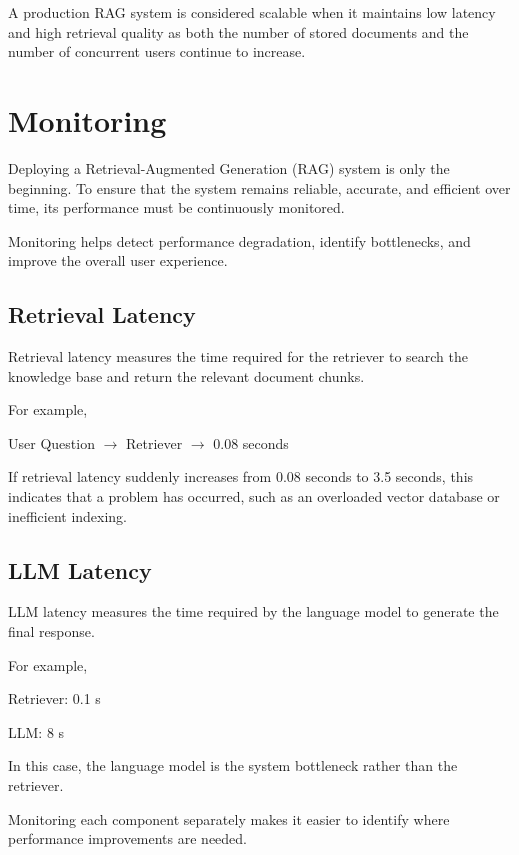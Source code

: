 A production RAG system is considered scalable when it maintains low latency and high retrieval quality as both the number of stored documents and the number of concurrent users continue to increase.



\section{Monitoring}

Deploying a Retrieval-Augmented Generation (RAG) system is only the beginning. To ensure that the system remains reliable, accurate, and efficient over time, its performance must be continuously monitored.

Monitoring helps detect performance degradation, identify bottlenecks, and improve the overall user experience.

\subsection*{Retrieval Latency}

Retrieval latency measures the time required for the retriever to search the knowledge base and return the relevant document chunks.

For example,

\begin{center}
User Question $\rightarrow$ Retriever $\rightarrow$ 0.08 seconds
\end{center}

If retrieval latency suddenly increases from 0.08 seconds to 3.5 seconds, this indicates that a problem has occurred, such as an overloaded vector database or inefficient indexing.

\subsection*{LLM Latency}

LLM latency measures the time required by the language model to generate the final response.

For example,

\begin{center}
Retriever: 0.1 s

LLM: 8 s
\end{center}

In this case, the language model is the system bottleneck rather than the retriever.

Monitoring each component separately makes it easier to identify where performance improvements are needed.

